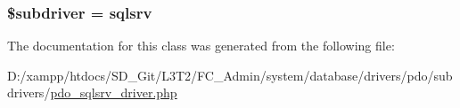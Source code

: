 \subsubsection[{\$subdriver}]{\setlength{\rightskip}{0pt plus 5cm}\$subdriver = \textquotesingle{}sqlsrv\textquotesingle{}}\label{class_c_i___d_b__pdo__sqlsrv__driver_a1322ca756348b11d080cb7a4f590de15}


The documentation for this class was generated from the following file\+:\begin{DoxyCompactItemize}
\item 
D\+:/xampp/htdocs/\+S\+D\+\_\+\+Git/\+L3\+T2/\+F\+C\+\_\+\+Admin/system/database/drivers/pdo/subdrivers/\hyperlink{pdo__sqlsrv__driver_8php}{pdo\+\_\+sqlsrv\+\_\+driver.\+php}\end{DoxyCompactItemize}
